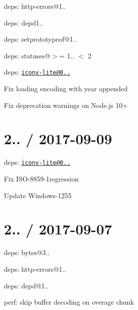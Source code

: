 
\begin{DoxyItemize}
\item deps\+: http-\/errors@1..
\begin{DoxyItemize}
\item deps\+: depd1..
\item deps\+: setprototypeof@1..
\item deps\+: statuses@\textquotesingle{}$>$= 1.. $<$ 2\textquotesingle{}
\end{DoxyItemize}
\item deps\+: \href{mailto:iconv-lite@0.4.23}{\tt iconv-\/lite@0..}
\begin{DoxyItemize}
\item Fix loading encoding with year appended
\item Fix deprecation warnings on Node.\+js 10+
\end{DoxyItemize}
\end{DoxyItemize}

\section*{2.. / 2017-\/09-\/09 }


\begin{DoxyItemize}
\item deps\+: \href{mailto:iconv-lite@0.4.19}{\tt iconv-\/lite@0..}
\begin{DoxyItemize}
\item Fix I\+S\+O-\/8859-\/1regression
\item Update Windows-\/1255
\end{DoxyItemize}
\end{DoxyItemize}

\section*{2.. / 2017-\/09-\/07 }


\begin{DoxyItemize}
\item deps\+: bytes@3..
\item deps\+: http-\/errors@1..
\begin{DoxyItemize}
\item deps\+: depd@1..
\end{DoxyItemize}
\item perf\+: skip buffer decoding on overage chunk
\end{DoxyItemize}

